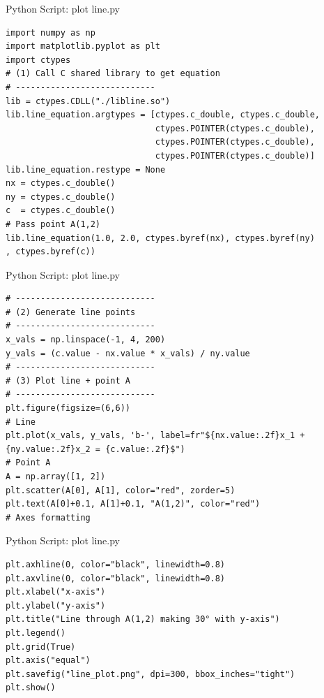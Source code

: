 \documentclass{beamer}
\numberwithin{equation}{section}
\theoremstyle{remark}
\begin{document}
\begin{frame}[fragile]{Python Script:  plot line.py}
\begin{verbatim}
import numpy as np
import matplotlib.pyplot as plt
import ctypes
# (1) Call C shared library to get equation
# ----------------------------
lib = ctypes.CDLL("./libline.so")
lib.line_equation.argtypes = [ctypes.c_double, ctypes.c_double,
                              ctypes.POINTER(ctypes.c_double),
                              ctypes.POINTER(ctypes.c_double),
                              ctypes.POINTER(ctypes.c_double)]
lib.line_equation.restype = None
nx = ctypes.c_double()
ny = ctypes.c_double()
c  = ctypes.c_double()
# Pass point A(1,2)
lib.line_equation(1.0, 2.0, ctypes.byref(nx), ctypes.byref(ny)
, ctypes.byref(c))
\end{verbatim}
\end{frame}
\begin{frame}[fragile]{Python Script:  plot line.py}
\begin{verbatim}
# ----------------------------
# (2) Generate line points
# ----------------------------
x_vals = np.linspace(-1, 4, 200)
y_vals = (c.value - nx.value * x_vals) / ny.value
# ----------------------------
# (3) Plot line + point A
# ----------------------------
plt.figure(figsize=(6,6))
# Line
plt.plot(x_vals, y_vals, 'b-', label=fr"${nx.value:.2f}x_1 + {ny.value:.2f}x_2 = {c.value:.2f}$")
# Point A
A = np.array([1, 2])
plt.scatter(A[0], A[1], color="red", zorder=5)
plt.text(A[0]+0.1, A[1]+0.1, "A(1,2)", color="red")
# Axes formatting
\end{verbatim}
\end{frame}
\begin{frame}[fragile]{Python Script:  plot line.py}
\begin{verbatim}
plt.axhline(0, color="black", linewidth=0.8)
plt.axvline(0, color="black", linewidth=0.8)
plt.xlabel("x-axis")
plt.ylabel("y-axis")
plt.title("Line through A(1,2) making 30° with y-axis")
plt.legend()
plt.grid(True)
plt.axis("equal")
plt.savefig("line_plot.png", dpi=300, bbox_inches="tight")
plt.show()

\end{verbatim}
\end{frame}
\end{document}

